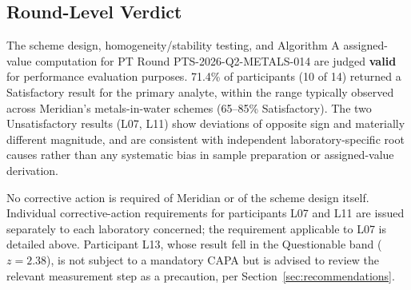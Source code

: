 \subsection{Round-Level Verdict}

\begin{tcolorbox}[satbox, title={\faCheckCircle\ Overall Round Verdict: VALID AND SATISFACTORY}]
The scheme design, homogeneity/stability testing, and Algorithm A assigned-value computation for
PT Round PTS-2026-Q2-METALS-014 are judged \textbf{valid} for performance evaluation purposes.
71.4\% of participants (10 of 14) returned a Satisfactory result for the primary analyte, within
the range typically observed across Meridian's metals-in-water schemes (65--85\% Satisfactory).
The two Unsatisfactory results (L07, L11) show deviations of opposite sign and materially
different magnitude, and are consistent with independent laboratory-specific root causes rather
than any systematic bias in sample preparation or assigned-value derivation.
\end{tcolorbox}

\vspace{0.6em}
No corrective action is required of Meridian or of the scheme design itself. Individual
corrective-action requirements for participants L07 and L11 are issued separately to each
laboratory concerned; the requirement applicable to L07 is detailed above. Participant L13, whose
result fell in the Questionable band (\(z = 2.38\)), is not subject to a mandatory CAPA but is
advised to review the relevant measurement step as a precaution, per Section~\ref{sec:recommendations}.
